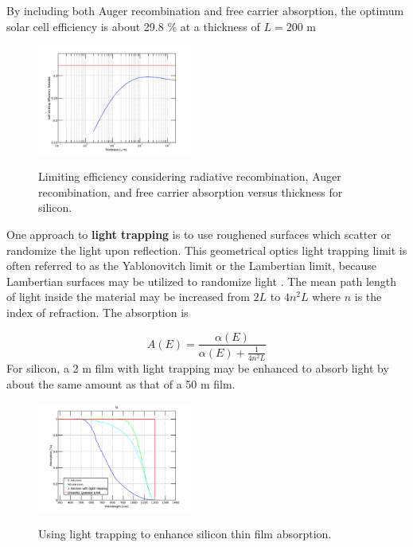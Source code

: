 \documentclass[12pt]{article}
\begin{document}
By including both Auger recombination and free carrier absorption, the optimum solar cell efficiency is about 29.8 \% at a thickness of $L = 200$ \hbox{\textmu}m
\begin{figure}[H]
\centering
\vspace{-10pt}
{\includegraphics[width=0.45\textwidth]{Figures/LimitingEfficiencyDetailedVersusThickness}} 
 \caption[Detailed limiting efficiency versus thickness]{Limiting efficiency considering radiative recombination, Auger recombination, and free carrier absorption versus thickness for silicon.}
  \label{fig:limitingEfficiencyVersusThickness}
\end{figure}

One approach to \textbf{light trapping} is to use roughened surfaces which scatter or randomize the light upon reflection.  This geometrical optics light trapping limit is often referred to as the Yablonovitch limit\cite{Yablonovitch:82july} or the Lambertian limit, because Lambertian surfaces may be utilized to randomize light \cite{Sheng:84}.  The mean path length of light inside the material may be increased from $2 L$ to $4 n^2 L$ where $n$ is the index of refraction.  The absorption is 

\begin{equation}
A(E) = \frac{\alpha(E)}{\alpha(E) + \frac{1}{4 n^2 L}}
\end{equation}
For silicon, a 2 \hbox{\textmu}m film with light trapping may be enhanced to absorb light by about the same amount as that of a 50 \hbox{\textmu}m film.  

\begin{figure}[H]
\centering
\vspace{-10pt}
{\includegraphics[width=0.45\textwidth]{Figures/SiliconFilmAbsorptionWLightTrappingVersusWavelength}} 
 \caption[Absorption with light trapping]{Using light trapping to enhance silicon thin film absorption.}
  \label{fig:limitingEfficiencyVersusThickness}
\end{figure}
\end{document}
